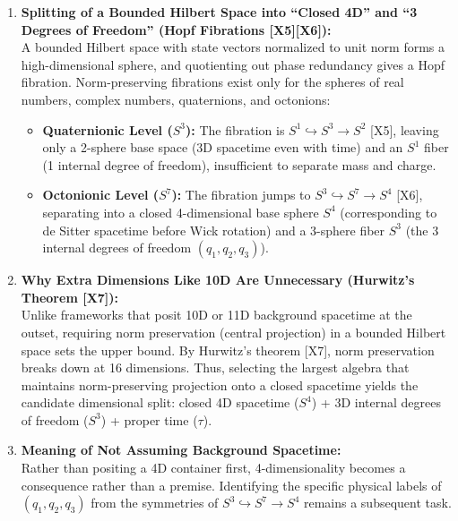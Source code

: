 \documentclass[
  a4paper,
]{article}
\providecommand{\tightlist}{%
  \setlength{\itemsep}{0pt}\setlength{\parskip}{0pt}}
\begin{document}
\begin{enumerate}
\def\labelenumi{\arabic{enumi}.}
\tightlist
\item
  \textbf{Splitting of a Bounded Hilbert Space into ``Closed 4D'' and
  ``3 Degrees of Freedom'' (Hopf Fibrations {[}X5{]}{[}X6{]}):}\\
  A bounded Hilbert space with state vectors normalized to unit norm
  forms a high-dimensional sphere, and quotienting out phase redundancy
  gives a Hopf fibration. Norm-preserving fibrations exist only for the
  spheres of real numbers, complex numbers, quaternions, and octonions:

  \begin{itemize}
  \tightlist
  \item
    \textbf{Quaternionic Level (\(S^3\)):} The fibration is
    \(S^1 \hookrightarrow S^3 \to S^2\) {[}X5{]}, leaving only a
    2-sphere base space (3D spacetime even with time) and an \(S^1\)
    fiber (1 internal degree of freedom), insufficient to separate mass
    and charge.
  \item
    \textbf{Octonionic Level (\(S^7\)):} The fibration jumps to
    \(S^3 \hookrightarrow S^7 \to S^4\) {[}X6{]}, separating into a
    closed 4-dimensional base sphere \(S^4\) (corresponding to de Sitter
    spacetime before Wick rotation) and a 3-sphere fiber \(S^3\) (the 3
    internal degrees of freedom \((q_1, q_2, q_3)\)).
  \end{itemize}
\item
  \textbf{Why Extra Dimensions Like 10D Are Unnecessary (Hurwitz's
  Theorem {[}X7{]}):}\\
  Unlike frameworks that posit 10D or 11D background spacetime at the
  outset, requiring norm preservation (central projection) in a bounded
  Hilbert space sets the upper bound. By Hurwitz's theorem {[}X7{]},
  norm preservation breaks down at 16 dimensions. Thus, selecting the
  largest algebra that maintains norm-preserving projection onto a
  closed spacetime yields the candidate dimensional split: closed 4D
  spacetime (\(S^4\)) + 3D internal degrees of freedom (\(S^3\)) +
  proper time (\(\tau\)).
\item
  \textbf{Meaning of Not Assuming Background Spacetime:}\\
  Rather than positing a 4D container first, 4-dimensionality becomes a
  consequence rather than a premise. Identifying the specific physical
  labels of \((q_1, q_2, q_3)\) from the symmetries of
  \(S^3 \hookrightarrow S^7 \to S^4\) remains a subsequent task.
\end{enumerate}
\end{document}
